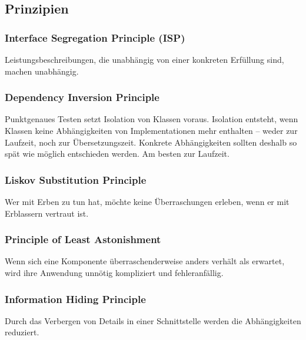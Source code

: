 \documentclass[a5paper, landscape]{article}
\begin{document}
	\newpage
	\begin{minipage}[t]{.5\textwidth}
		\subsection*{Prinzipien}
		\subsubsection*{Interface Segregation Principle (ISP)}
		Leistungsbeschreibungen, die unabhängig von einer konkreten Erfüllung sind, machen unabhängig.
		\subsubsection*{Dependency Inversion Principle}
		Punktgenaues Testen setzt Isolation von Klassen voraus. Isolation entsteht, wenn Klassen keine Abhängigkeiten von Implementationen mehr enthalten – weder zur Laufzeit, noch zur Übersetzungszeit. Konkrete Abhängigkeiten sollten deshalb so spät wie möglich entschieden werden. Am besten zur Laufzeit.
		\subsubsection*{Liskov Substitution Principle}
		Wer mit Erben zu tun hat, möchte keine Überraschungen erleben, wenn er mit Erblassern vertraut ist.
		\subsubsection*{Principle of Least Astonishment}
		Wenn sich eine Komponente überraschenderweise anders verhält als erwartet, wird ihre Anwendung unnötig kompliziert und fehleranfällig.
		\subsubsection*{Information Hiding Principle}
		Durch das Verbergen von Details in einer Schnittstelle werden die Abhängigkeiten reduziert.
	\end{minipage}
	\hspace{0.5cm}
\end{document}
